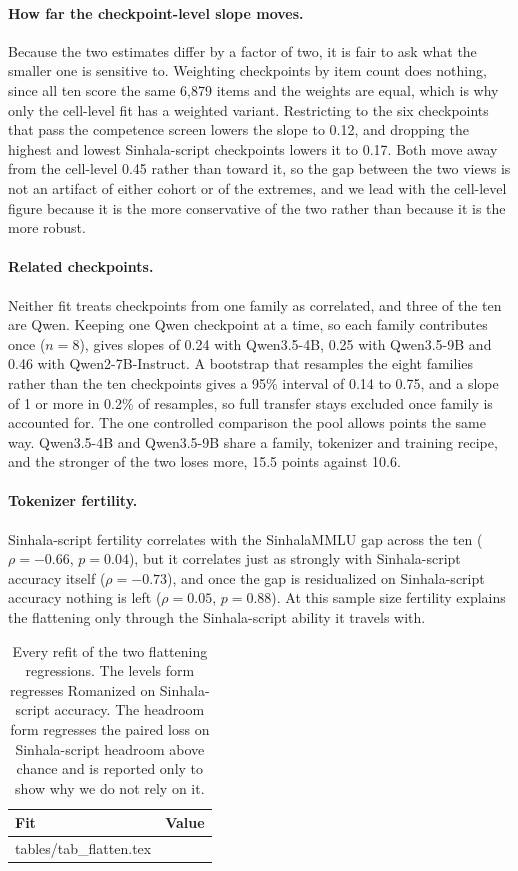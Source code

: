 \documentclass{article}
\makeatletter
\newcommand{\rows}[1]{\@@input #1 }
\makeatother
\begin{document}
\paragraph{How far the checkpoint-level slope moves.} Because the two estimates differ by
a factor of two, it is fair to ask what the smaller one is sensitive to. Weighting
checkpoints by item count does nothing, since all ten score the same 6{,}879 items and the
weights are equal, which is why only the cell-level fit has a weighted variant. Restricting
to the six checkpoints that pass the competence screen lowers the slope to 0.12, and
dropping the highest and lowest Sinhala-script checkpoints lowers it to 0.17. Both move
away from the cell-level 0.45 rather than toward it, so the gap between the two views is
not an artifact of either cohort or of the extremes, and we lead with the cell-level
figure because it is the more conservative of the two rather than because it is the more
robust.

\paragraph{Related checkpoints.} Neither fit treats checkpoints from one family as
correlated, and three of the ten are Qwen. Keeping one Qwen checkpoint at a time, so each
family contributes once ($n = 8$), gives slopes of 0.24 with Qwen3.5-4B, 0.25 with
Qwen3.5-9B and 0.46 with Qwen2-7B-Instruct. A bootstrap that resamples the eight families
rather than the ten checkpoints gives a 95\% interval of 0.14 to 0.75, and a slope of 1 or
more in 0.2\% of resamples, so full transfer stays excluded once family is accounted for.
The one controlled comparison the pool allows points the same way. Qwen3.5-4B and
Qwen3.5-9B share a family, tokenizer and training recipe, and the stronger of the two
loses more, 15.5 points against 10.6.

\paragraph{Tokenizer fertility.} Sinhala-script fertility correlates with the SinhalaMMLU
gap across the ten ($\rho = -0.66$, $p = 0.04$), but it correlates just as strongly with
Sinhala-script accuracy itself ($\rho = -0.73$), and once the gap is residualized on
Sinhala-script accuracy nothing is left ($\rho = 0.05$, $p = 0.88$). At this sample size
fertility explains the flattening only through the Sinhala-script ability it travels with.

\begin{table}[t]
\caption{Every refit of the two flattening regressions. The levels form regresses
Romanized on Sinhala-script accuracy. The headroom form regresses the paired loss on
Sinhala-script headroom above chance and is reported only to show why we do not rely
on it.}
\label{tab:flatten}
\centering\footnotesize
\setlength{\tabcolsep}{2pt}
\begin{tabular}{@{}lr@{}}
\toprule
\textbf{Fit} & \textbf{Value} \\
\midrule
\rows{tables/tab_flatten.tex}
\bottomrule
\end{tabular}
\end{table}
\end{document}
